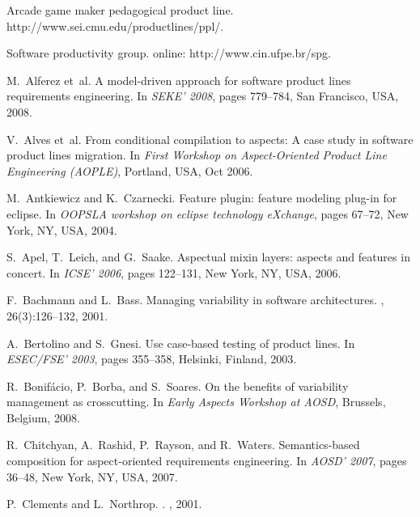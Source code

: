 \documentclass{sig-alt-full}
\begin{document}
%
%

\begin{thebibliography}{10}

Arcade game maker pedagogical product line.
\newblock http://www.sei.cmu.edu/productlines/ppl/.

Software productivity group.
\newblock online: http://www.cin.ufpe.br/spg.

M.~Alferez et~al.
\newblock A model-driven approach for software product lines requirements
  engineering.
\newblock In {\em SEKE' 2008}, pages 779--784, San Francisco, USA, 2008.

V.~Alves et~al.
\newblock From conditional compilation to aspects: A case study in software
  product lines migration.
\newblock In {\em First Workshop on Aspect-Oriented Product Line Engineering
  (AOPLE)}, Portland, USA, Oct 2006.

M.~Antkiewicz and K.~Czarnecki.
\newblock Feature plugin: feature modeling plug-in for eclipse.
\newblock In {\em OOPSLA workshop on eclipse technology eXchange}, pages
  67--72, New York, NY, USA, 2004.

S.~Apel, T.~Leich, and G.~Saake.
\newblock Aspectual mixin layers: aspects and features in concert.
\newblock In {\em ICSE' 2006}, pages 122--131, New York, NY, USA, 2006.

F.~Bachmann and L.~Bass.
\newblock Managing variability in software architectures.
, 26(3):126--132, 2001.

A.~Bertolino and S.~Gnesi.
\newblock Use case-based testing of product lines.
\newblock In {\em ESEC/FSE' 2003}, pages 355--358, Helsinki, Finland, 2003.

R.~Bonif\'{a}cio, P.~Borba, and S.~Soares.
\newblock On the benefits of variability management as crosscutting.
\newblock In {\em Early Aspects Workshop at AOSD}, Brussels, Belgium, 2008.

R.~Chitchyan, A.~Rashid, P.~Rayson, and R.~Waters.
\newblock Semantics-based composition for aspect-oriented requirements
  engineering.
\newblock In {\em AOSD' 2007}, pages 36--48, New York, NY, USA, 2007.

P.~Clements and L.~Northrop.
.
, 2001.


\end{thebibliography}
\end{document}
